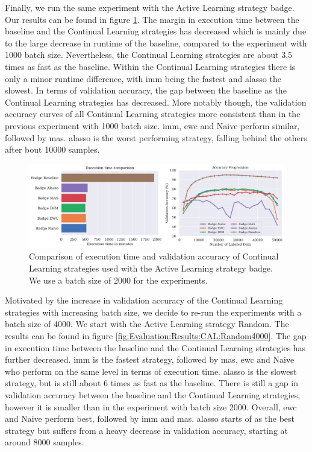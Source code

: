 Finally, we run the same experiment with the Active Learning strategy \gls{badge}. Our results can be found in figure \ref{fig:Evaluation:Results:CAL:Badge2000}. The margin in execution time between the baseline
and the Continual Learning strategies has decreased which is mainly due to the large decrease in runtime of the baseline, compared to the experiment with 1000 batch size. Nevertheless, the Continual
Learning strategies are about 3.5 times as fast as the baseline. Within the Continual Learning strategies there is only a minor runtime difference, with \gls{imm} being the fastest and \gls{alasso} the slowest. In terms of 
validation accuracy, the gap between the baseline as the Continual Learning strategies has decreased. More notably though, the validation accuracy curves of all Continual Learning strategies more consistent than
in the previous experiment with 1000 batch size. \gls{imm}, \gls{ewc} and Naive perform similar, followed by \gls{mas}. \gls{alasso} is the worst performing strategy, falling behind the others after bout 10000 samples. \par

\begin{figure}[h]
    \centering
    \includegraphics[width=\linewidth]{images/results_CAL/Badge_CAL_2000b.png}
    \caption[Continual Active Learning \gls{badge} 2000 batch size]{Comparison of execution time and validation accuracy of Continual Learning strategies used with the Active Learning strategy
    \gls{badge}. We use a batch size of 2000 for the experiments.}
    \label{fig:Evaluation:Results:CAL:Badge2000}
\end{figure}

Motivated by the increase in validation accuracy of the Continual Learning strategies with increasing batch size, we decide to re-run the experiments with a batch size of 4000. We start with the Active Learning
strategy Random. The results can be found in figure \ref{fig:Evaluation:Results:CAL:Random4000}. The gap in execution time between the baseline and the Continual Learning strategies has further decreased. \gls{imm} is
the fastest strategy, followed by \gls{mas}, \gls{ewc} and Naive who perform on the same level in terms of execution time. \gls{alasso} is the slowest strategy, but is still about 6 times as fast as the baseline. There is still a
gap in validation accuracy between the baseline and the Continual Learning strategies, however it is smaller than in the experiment with batch size 2000. Overall, \gls{ewc} and Naive perform best, followed by \gls{imm} and \gls{mas}.
\gls{alasso} starts of as the best strategy but suffers from a heavy decrease in validation accuracy, starting at around 8000 samples. \par

